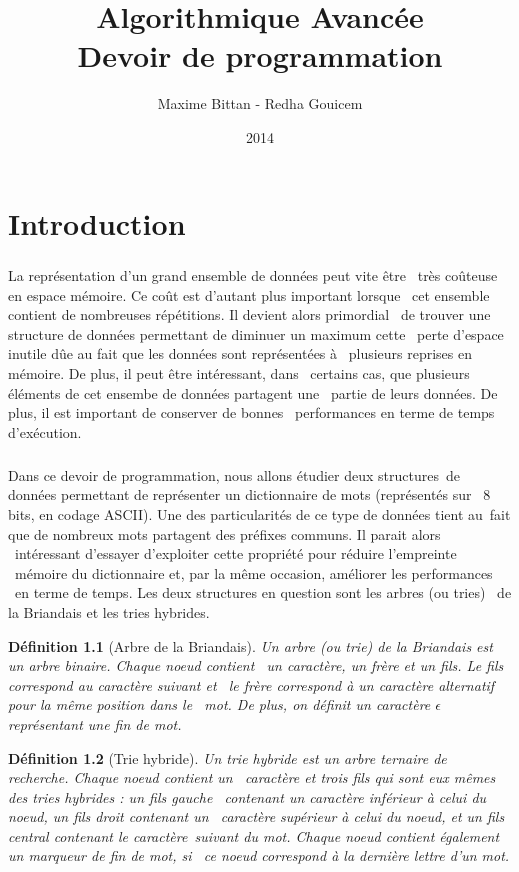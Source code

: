 \documentclass[11pt]{report} %
\title{Algorithmique Avancée\\Devoir de programmation}
\author{Maxime Bittan - Redha Gouicem}
\date{2014} %
\newtheorem{definition}{Définition}
\begin{document}
\maketitle

\chapter{Introduction}

\paragraph{} La représentation d'un grand ensemble de données peut vite être \
très coûteuse en espace mémoire. Ce coût est d'autant plus important lorsque \
cet ensemble contient de nombreuses répétitions. Il devient alors primordial \
de trouver une structure de données permettant de diminuer un maximum cette \
perte d'espace inutile dûe au fait que les données sont représentées à \
plusieurs reprises en mémoire. De plus, il peut être intéressant, dans \
certains cas, que plusieurs éléments de cet ensembe de données partagent une \
partie de leurs données. De plus, il est important de conserver de bonnes \
performances en terme de temps d'exécution.
\paragraph{} Dans ce devoir de programmation, nous allons étudier deux structures\
 de données permettant de représenter un dictionnaire de mots (représentés sur \
8 bits, en codage ASCII). Une des particularités de ce type de données tient au\
 fait que de nombreux mots partagent des préfixes communs. Il parait alors \
intéressant d'essayer d'exploiter cette propriété pour réduire l'empreinte \
mémoire du  dictionnaire et, par la même occasion, améliorer les performances \
en terme de temps. Les deux structures en question sont les arbres (ou tries) \
de la Briandais et les tries hybrides.
\begin{definition}[Arbre de la Briandais]
Un arbre (ou trie) de la Briandais est un arbre binaire. Chaque noeud contient \
un caractère, un frère et un fils. Le fils correspond au caractère suivant et \
le frère correspond à un caractère alternatif pour la même position dans le \
mot. De plus, on définit un caractère $\epsilon$ représentant une fin de mot.
\end{definition}
\begin{definition}[Trie hybride]
Un trie hybride est un arbre ternaire de recherche. Chaque noeud contient un \
caractère et trois fils qui sont eux mêmes des tries hybrides : un fils gauche \
contenant un caractère inférieur à celui du noeud, un fils droit contenant un \
caractère supérieur à celui du noeud, et un fils central contenant le caractère\
 suivant du mot. Chaque noeud contient également un marqueur de fin de mot, si \
ce noeud correspond à la dernière lettre d'un mot.
\end{definition}
\end{document}
